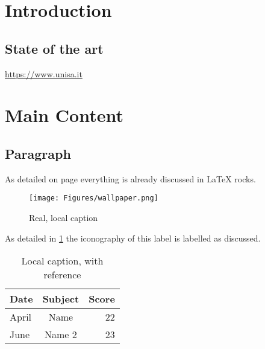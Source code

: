 \documentclass{article}
\begin{document}
\setcounter{page}{1}
\section{Introduction}\label{sec:intro}
\subsection{State of the art}
\url{https://www.unisa.it}

\section{Main Content}\label{sec:soa}
\subsection{Paragraph}\label{sec:par1}

As detailed on page \pageref{sec:intro} everything is already
discussed in \textcite{test} \LaTeX{} rocks.

\begin{figure}[H]
    \centering
    \texttt{[image: Figures/wallpaper.png]}
    \caption[Optional caption]{Real, local caption}
    \label{fig:fig1}
\end{figure}
As detailed in \ref{fig:fig1} the iconography of this label is labelled
as discussed.

\begin{table}[H]
    \centering
    \label{tab:table1}
    \caption[This is optional caption, without reference]{Local caption, with reference}
    \begin{tabular}{ l c r }
        \bfseries{Date} & Subject & Score \\ \hline
        April & Name & 22 \\
        June & Name 2 & 23
    \end{tabular}
\end{table}

\cleardoublepage
\printbibliography
{}
\end{document}
